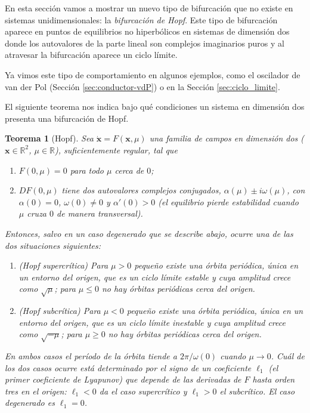 \documentclass[12pt, a4paper]{amsbook}
\newcommand{\R}{{\mathbb R}}
\newcommand{\xx}{{\mathbf x}}
\newtheorem{teo}{Teorema}[section]
\theoremstyle{remark}
\theoremstyle{definition}
\numberwithin{section}{chapter}
\numberwithin{subsection}{section}
\numberwithin{equation}{section}
\numberwithin{figure}{chapter}
\begin{document}
En esta sección vamos a mostrar un nuevo tipo de bifurcación que no existe en sistemas unidimensionales: la {\em bifurcación de Hopf}. Este tipo de bifurcación aparece en puntos de equilibrios no hiperbólicos en sistemas de dimensión dos donde los autovalores de la parte lineal son complejos imaginarios puros y al atravesar la bifurcación aparece un ciclo límite.

Ya vimos este tipo de comportamiento en algunos ejemplos, como el oscilador de van der Pol (Sección \ref{sec:conductor-vdP}) o en la Sección \ref{sec:ciclo_limite}.

El siguiente teorema nos indica bajo qué condiciones un sistema en dimensión dos presenta una bifurcación de Hopf.
\begin{teo}[Hopf]\label{teo.hopf}
Sea $\dot\xx = F(\xx, \mu)$ una familia de campos en dimensión dos ($\xx\in\R^2$, $\mu\in\R$), suficientemente regular, tal que
\begin{enumerate}
\item $F(0,\mu)=0$ para todo $\mu$ cerca de $0$;

\item $DF(0,\mu)$ tiene dos autovalores complejos conjugados, $\alpha(\mu)\pm i\omega(\mu)$, con $\alpha(0)=0$, $\omega(0)\neq 0$ y $\alpha'(0)>0$ (el equilibrio pierde estabilidad cuando $\mu$ cruza $0$ de manera transversal).
\end{enumerate}
Entonces, salvo en un caso degenerado que se describe abajo, ocurre una de las dos situaciones siguientes:
\begin{enumerate}
\item[(a)] (\emph{Hopf supercrítica}) Para $\mu>0$ pequeño existe una órbita periódica, única en un entorno del origen, que es un ciclo límite estable y cuya amplitud crece como $\sqrt{\mu}$; para $\mu\le 0$ no hay órbitas periódicas cerca del origen.
\item[(b)] (\emph{Hopf subcrítica}) Para $\mu<0$ pequeño existe una órbita periódica, única en un entorno del origen, que es un ciclo límite inestable y cuya amplitud crece como $\sqrt{-\mu}$; para $\mu\ge 0$ no hay órbitas periódicas cerca del origen.
\end{enumerate}
En ambos casos el período de la órbita tiende a $2\pi/\omega(0)$ cuando $\mu\to 0$. Cuál de los dos casos ocurre está determinado por el signo de un coeficiente $\ell_1$ (el \emph{primer coeficiente de Lyapunov}) que depende de las derivadas de $F$ hasta orden tres en el origen: $\ell_1<0$ da el caso supercrítico y $\ell_1>0$ el subcrítico. El caso degenerado es $\ell_1=0$.
\end{teo}
\end{document}
